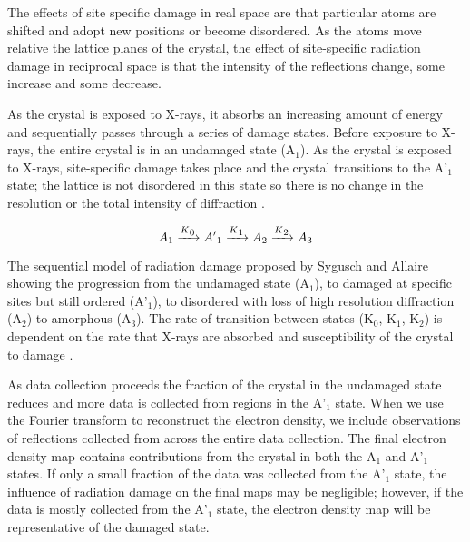 The effects of site specific damage in real space are that particular atoms are shifted and adopt new positions or become disordered. As the atoms move relative the lattice planes of the crystal, the effect of site-specific radiation damage in reciprocal space is that the intensity of the reflections change, some increase and some decrease. 

As the crystal is exposed to X-rays, it absorbs an increasing amount of energy and sequentially passes through a series of damage states. Before exposure to X-rays, the entire crystal is in an undamaged state (A$_1$). As the crystal is exposed to X-rays, site-specific damage takes place and the crystal transitions to the A'$_1$ state; the lattice is not disordered in this state so there is no change in the resolution or the total intensity of diffraction \cite{Sygusch1988}. 


\begin{minipage}[t]{\textwidth}
\begin{equation}
A\textsubscript{1} \xrightarrow{K\textsubscript{0}} A'\textsubscript{1} \xrightarrow{K\textsubscript{1}} A\textsubscript{2} \xrightarrow{K\textsubscript{2}} A\textsubscript{3}
\end{equation}


The sequential model of radiation damage proposed by Sygusch and Allaire showing the progression from the undamaged state (A$_1$), to damaged at specific sites but still ordered (A'$_1$), to disordered with loss of high resolution diffraction (A$_2$) to amorphous (A$_3$). The rate of transition between states (K$_0$, K$_1$, K$_2$) is dependent on the rate that X-rays are absorbed and susceptibility of the crystal to damage \cite{Sygusch1988}. 
\end{minipage} \par

As data collection proceeds the fraction of the crystal in the undamaged state reduces and more data is collected from regions in the A'$_1$ state. When we use the Fourier transform to reconstruct the electron density, we include observations of reflections collected from across the entire data collection. The final electron density map contains contributions from the crystal in both the A$_1$ and A'$_1$ states. If only a small fraction of the data was collected from the A'$_1$ state, the influence of radiation damage on the final maps may be negligible; however, if the data is mostly collected from the A'$_1$ state, the electron density map will be representative of the damaged state.

